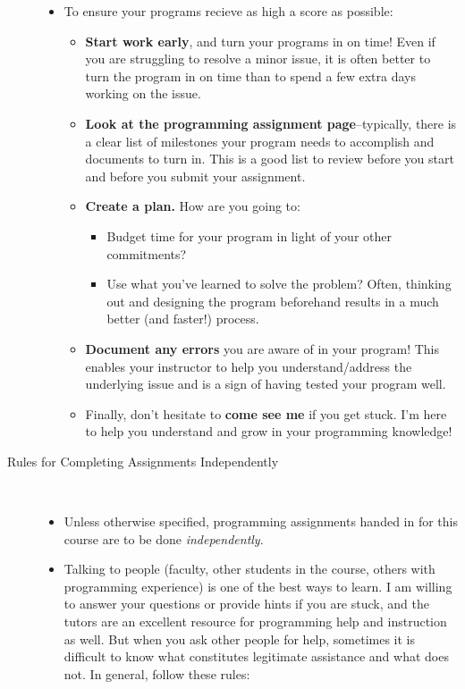 \documentclass [letterpaper,11pt]{article}
\begin{document}
\begin{description}
\begin{itemize}
\item To ensure your programs recieve as high a score as possible:
	\begin{itemize}
	\item  \textbf{Start work early}, and turn your programs in on time!  Even if you are struggling to resolve a minor issue, it is often better to turn the program in on time than to spend a few extra days working on the issue.
	\item 	\textbf{Look at the programming assignment page}--typically, there is a clear list of milestones your program needs to accomplish and documents to turn in.  This is a good list to review before you start and before you submit your assignment.
	\item  \textbf{Create a plan.} How are you going to:
\begin{itemize}
\item Budget time for your program in light of your other commitments?
\item Use what you've learned to solve the problem?  Often, thinking out and designing the program beforehand results in a much better (and faster!) process.
\end{itemize}
	\item	\textbf{Document any errors} you are aware of in your program!  This enables your instructor to help you understand/address the underlying issue and is a sign of having tested your program well.
\item 	Finally, don't hesitate to \textbf{come see me} if you get stuck.  I'm here to help you understand and grow in your programming knowledge!
\end{itemize}
\end{itemize}

\item[Rules for Completing Assignments Independently]\
\begin{itemize}
        \item Unless otherwise specified, programming assignments handed in for this course are to be done \emph{independently}.  
        \item Talking to people (faculty, other students in the course, others with programming experience) is one of the best ways to learn.  I am willing to answer your questions or provide hints if you are stuck, and the tutors are an excellent resource for programming help and instruction as well.  But when you ask other people for help, sometimes
        it is difficult to know what constitutes legitimate assistance and what does not.  In general, follow these rules:
        

\end{itemize}
\end{description}
\end{document}
